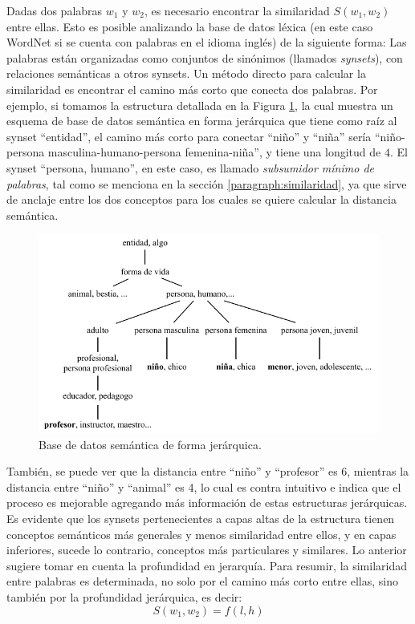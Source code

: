 \bigskip Dadas dos palabras \(w_1\) y \(w_2\), es necesario encontrar la similaridad \(S(w_1,w_2)\) entre ellas. Esto es posible analizando la base de datos léxica (en este caso WordNet si se cuenta con palabras en el idioma inglés) de la siguiente forma: Las palabras están organizadas como conjuntos de sinónimos (llamados \textit{synsets}), con relaciones semánticas a otros synsets. Un método directo para calcular la similaridad es encontrar el camino más corto que conecta dos palabras. Por ejemplo, si tomamos la estructura detallada en la Figura \ref{fig:taxonomiasemantica}, la cual muestra un esquema de base de datos semántica en forma jerárquica que tiene como raíz al synset ``entidad'', el camino más corto para conectar ``niño'' y ``niña'' sería ``niño-persona masculina-humano-persona femenina-niña'', y tiene una longitud de \(4\). El synset ``persona, humano'', en este caso, es llamado \textit{subsumidor mínimo de palabras}, tal como se menciona en la sección \ref{paragraph:similaridad}, ya que sirve de anclaje entre los dos conceptos para los cuales se quiere calcular la distancia semántica.

\begin{figure}[h!]
	\centering
	\includegraphics[width=0.9\linewidth]{7_marco_teorico/imagenes/taxonomia_semantica}
	\caption{Base de datos semántica de forma jerárquica.}
	\label{fig:taxonomiasemantica}
\end{figure}

También, se puede ver que la distancia entre ``niño'' y ``profesor'' es 6, mientras la distancia entre ``niño'' y ``animal'' es 4, lo cual es contra intuitivo e indica que el proceso es mejorable agregando más información de estas estructuras jerárquicas. Es evidente que los synsets pertenecientes a capas altas de la estructura tienen conceptos semánticos más generales y menos similaridad entre ellos, y en capas inferiores, sucede lo contrario, conceptos más particulares y similares. Lo anterior sugiere tomar en cuenta la profundidad en jerarquía. Para resumir, la similaridad entre palabras es determinada, no solo por el camino más corto entre ellas, sino también por la profundidad jerárquica, es decir:
\[S(w_1,w_2)=f(l,h)\]

